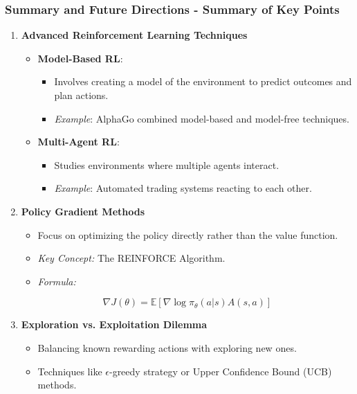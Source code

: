 \documentclass{beamer}
\begin{document}
\begin{frame}[fragile]
    \frametitle{Summary and Future Directions - Summary of Key Points}
    
    \begin{enumerate}
        \item \textbf{Advanced Reinforcement Learning Techniques}
            \begin{itemize}
                \item \textbf{Model-Based RL}:
                    \begin{itemize}
                        \item Involves creating a model of the environment to predict outcomes and plan actions.
                        \item \textit{Example}: AlphaGo combined model-based and model-free techniques.
                    \end{itemize}
                \item \textbf{Multi-Agent RL}:
                    \begin{itemize}
                        \item Studies environments where multiple agents interact.
                        \item \textit{Example}: Automated trading systems reacting to each other.
                    \end{itemize}
            \end{itemize}
        
        \item \textbf{Policy Gradient Methods}
            \begin{itemize}
                \item Focus on optimizing the policy directly rather than the value function.
                \item \textit{Key Concept:} The REINFORCE Algorithm.
                \item \textit{Formula:}
                \end{itemize}
                \begin{equation}
                    \nabla J(\theta) = \mathbb{E} \left[ \nabla \log \pi_\theta(a|s) A(s,a) \right]
                \end{equation}
                
        \item \textbf{Exploration vs. Exploitation Dilemma}
            \begin{itemize}
                \item Balancing known rewarding actions with exploring new ones.
                \item Techniques like $\epsilon$-greedy strategy or Upper Confidence Bound (UCB) methods.
            \end{itemize}
    \end{enumerate}

\end{frame}
\end{document}
